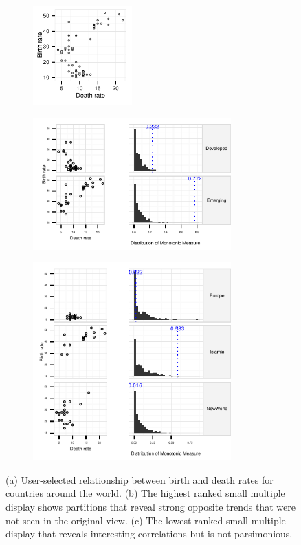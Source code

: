 \begin{figure}[t]
 \centering 
	 \begin{subfigure}{1.5in}
		\includegraphics[width=1.5in]{images/DEATH_RT-BIRTH_RT.pdf}
		  \caption{}
		 \label{fig:informative_all}
	\end{subfigure}
	\begin{subfigure}{3in}
		\includegraphics[width=3in]{images/9_95670214716782-GDP.pdf}
		  \caption{}
		 \label{fig:informative}
	 \end{subfigure}
	 \begin{subfigure}{3in}
		\includegraphics[width=3in]{images/3_97529346797117-GROUP.pdf}
		  \caption{}
		 \label{fig:not_informative}
	 \end{subfigure}
	  \caption{(a) User-selected relationship between birth and death rates for countries around the world. (b) The highest ranked small multiple display shows partitions that reveal strong opposite trends that were not seen in the original view. (c) The lowest ranked small multiple display that reveals interesting correlations but is not parsimonious.}
\end{figure}

